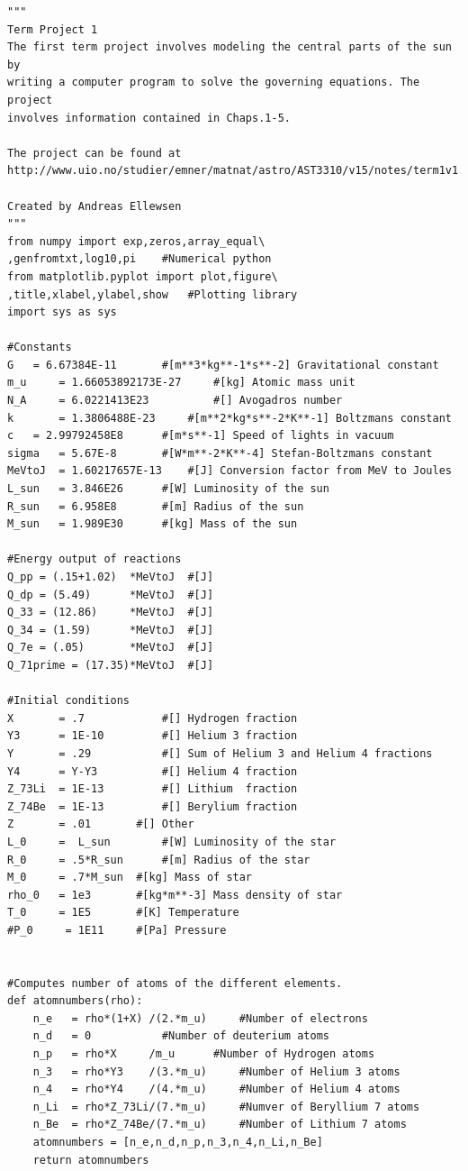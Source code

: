 \documentclass[a4paper,12pt]{article}
\begin{document}
\begin{verbatim}
"""
Term Project 1
The first term project involves modeling the central parts of the sun by
writing a computer program to solve the governing equations. The project
involves information contained in Chaps.1-5.

The project can be found at 
http://www.uio.no/studier/emner/matnat/astro/AST3310/v15/notes/term1v1.pdf

Created by Andreas Ellewsen
"""
from numpy import exp,zeros,array_equal\
,genfromtxt,log10,pi    #Numerical python
from matplotlib.pyplot import plot,figure\
,title,xlabel,ylabel,show	#Plotting library
import sys as sys

#Constants
G	= 6.67384E-11		#[m**3*kg**-1*s**-2] Gravitational constant
m_u 	= 1.66053892173E-27 	#[kg] Atomic mass unit
N_A 	= 6.0221413E23      	#[] Avogadros number
k   	= 1.3806488E-23		#[m**2*kg*s**-2*K**-1] Boltzmans constant
c	= 2.99792458E8		#[m*s**-1] Speed of lights in vacuum
sigma   = 5.67E-8		#[W*m**-2*K**-4] Stefan-Boltzmans constant
MeVtoJ 	= 1.60217657E-13 	#[J] Conversion factor from MeV to Joules
L_sun  	= 3.846E26		#[W] Luminosity of the sun
R_sun  	= 6.958E8		#[m] Radius of the sun
M_sun  	= 1.989E30		#[kg] Mass of the sun

#Energy output of reactions
Q_pp = (.15+1.02)  *MeVtoJ	#[J]
Q_dp = (5.49)	   *MeVtoJ	#[J]
Q_33 = (12.86)	   *MeVtoJ	#[J]
Q_34 = (1.59)	   *MeVtoJ	#[J]
Q_7e = (.05)	   *MeVtoJ	#[J]
Q_71prime = (17.35)*MeVtoJ	#[J]

#Initial conditions
X       = .7        	#[] Hydrogen fraction
Y3      = 1E-10     	#[] Helium 3 fraction
Y       = .29	    	#[] Sum of Helium 3 and Helium 4 fractions
Y4      = Y-Y3      	#[] Helium 4 fraction
Z_73Li  = 1E-13      	#[] Lithium  fraction
Z_74Be  = 1E-13     	#[] Berylium fraction
Z       = .01		#[] Other
L_0     =  L_sun    	#[W] Luminosity of the star
R_0     = .5*R_sun   	#[m] Radius of the star
M_0     = .7*M_sun	#[kg] Mass of star 
rho_0   = 1e3		#[kg*m**-3] Mass density of star 
T_0     = 1E5	  	#[K] Temperature
#P_0     = 1E11		#[Pa] Pressure


#Computes number of atoms of the different elements.
def atomnumbers(rho):
	n_e   = rho*(1+X) /(2.*m_u)    	#Number of electrons
	n_d   = 0			#Number of deuterium atoms
	n_p   = rho*X	  /m_u     	#Number of Hydrogen atoms
	n_3   = rho*Y3	  /(3.*m_u)     #Number of Helium 3 atoms
	n_4   = rho*Y4	  /(4.*m_u)     #Number of Helium 4 atoms
	n_Li  = rho*Z_73Li/(7.*m_u) 	#Numver of Beryllium 7 atoms
	n_Be  = rho*Z_74Be/(7.*m_u) 	#Number of Lithium 7 atoms
	atomnumbers = [n_e,n_d,n_p,n_3,n_4,n_Li,n_Be]
	return atomnumbers


\end{verbatim}
\end{document}
